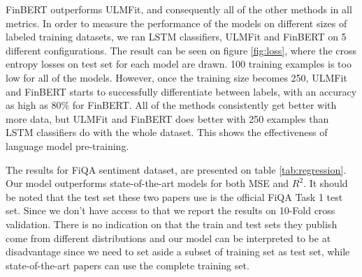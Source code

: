 \documentclass[../main.tex]{subfiles}
\begin{document}
FinBERT outperforms ULMFit, and consequently all of the other methods in all metrics. In order to measure the performance of the models on different sizes of labeled training datasets, we ran LSTM classifiers, ULMFit and FinBERT on 5 different configurations. The result can be seen on figure \ref{fig:loss}, where the cross entropy losses on test set for each model are drawn. 100 training examples is too low for all of the models. However, once the training size becomes 250, ULMFit and FinBERT starts to successfully differentiate between labels, with an accuracy as high as 80\% for FinBERT. All of the methods consistently get better with more data, but ULMFit and FinBERT does better with 250 examples than LSTM classifiers do with the whole dataset. This shows the effectiveness of language model pre-training.

The results for FiQA sentiment dataset, are presented on table \ref{tab:regression}. Our model outperforms state-of-the-art models for both MSE and $R^2$. It should be noted that the test set these two papers \cite{Yang2018} \cite{Piao2018} use is the official FiQA Task 1 test set. Since we don't have access to that we report the results on 10-Fold cross validation. There is no indication on \cite{Maia2018} that the train and test sets they publish come from different distributions and our model can be interpreted to be at disadvantage since we need to set aside a subset of training set as test set, while state-of-the-art papers can use the complete training set.
    
    
\end{document}
